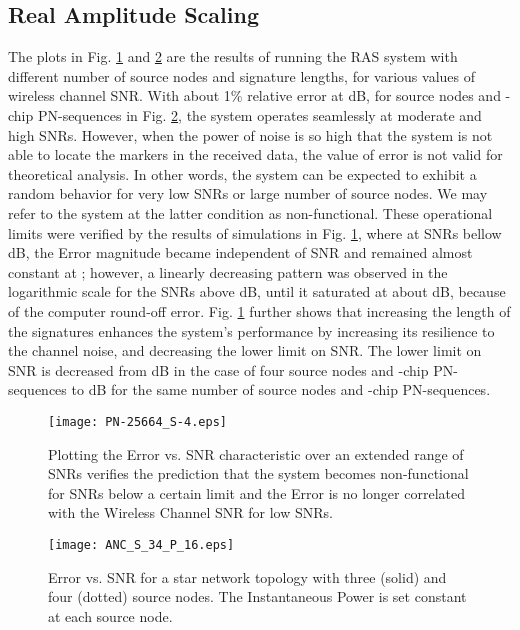 \documentclass[conference]{IEEEtran}
\begin{document}
\subsection{Real Amplitude Scaling}\label{sim:RAS}
The plots in Fig. \ref{fig:S3} and \ref{fig:S2} are the results of running the RAS system with different number of source nodes and signature lengths, for various values of wireless channel SNR. 
With about 1\% relative error at dB, for  source nodes and -chip PN-sequences in Fig. \ref{fig:S2}, the system operates seamlessly at moderate and high SNRs. However, when the power of noise is so high that the system is not able to locate the markers in the received data, the value of error is not valid for theoretical analysis. In other words, the system can be expected to exhibit a random behavior for very low SNRs or large number of source nodes. We may refer to the system at the latter condition as non-functional. These operational limits were verified by the results of simulations in Fig. \ref{fig:S3}, where at SNRs bellow dB, the Error magnitude became independent of SNR and remained almost constant at ; however, a linearly decreasing pattern was observed in the logarithmic scale for the SNRs above dB, until it saturated at about dB, because of the computer round-off error. Fig. \ref{fig:S3} further shows that increasing the length of the signatures enhances the system's performance by increasing its resilience to the channel noise, and decreasing the lower limit on SNR. The lower limit on SNR is decreased from dB in the case of four source nodes and -chip PN-sequences to dB for the same number of source nodes and -chip PN-sequences.

\begin{figure}[tp]
     \centering

     \texttt{[image: PN-25664\_S-4.eps]}
     \caption{Plotting the Error vs. SNR characteristic over an extended range of SNRs verifies the prediction that the system becomes non-functional for SNRs below a certain limit and the Error is no longer correlated with the Wireless Channel SNR for low SNRs.}
     \label{fig:S3}
\end{figure}

\begin{figure}[tp]
     \centering
           \texttt{[image: ANC\_S\_34\_P\_16.eps]}

     \caption{Error vs. SNR  for a star network topology with three (solid) and four (dotted) source nodes.  The Instantaneous Power is set constant at each source node.}
     \label{fig:S2}
\end{figure}
\end{document}
